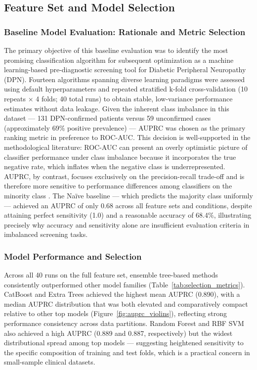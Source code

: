 \documentclass[pdflatex,sn-vancouver-num]{sn-jnl}
\begin{document}
\subsection{Feature Set and Model Selection}

\subsubsection{Baseline Model Evaluation: Rationale and Metric Selection}
The primary objective of this baseline evaluation was to identify the most promising classification algorithm for subsequent optimization as a machine learning-based pre-diagnostic screening tool for Diabetic Peripheral Neuropathy (DPN). Fourteen algorithms spanning diverse learning paradigms were assessed using default hyperparameters and repeated stratified k-fold cross-validation (10 repeats × 4 folds; 40 total runs) to obtain stable, low-variance performance estimates without data leakage.
Given the inherent class imbalance in this dataset — 131 DPN-confirmed patients versus 59 unconfirmed cases (approximately 69\% positive prevalence) — AUPRC was chosen as the primary ranking metric in preference to ROC-AUC. This decision is well-supported in the methodological literature: ROC-AUC can present an overly optimistic picture of classifier performance under class imbalance because it incorporates the true negative rate, which inflates when the negative class is underrepresented. AUPRC, by contrast, focuses exclusively on the precision-recall trade-off and is therefore more sensitive to performance differences among classifiers on the minority class \cite{saito2015precision, davis2006relationship}. The Naïve baseline — which predicts the majority class uniformly — achieved an AUPRC of only 0.68 across all feature sets and conditions, despite attaining perfect sensitivity (1.0) and a reasonable accuracy of 68.4\%, illustrating precisely why accuracy and sensitivity alone are insufficient evaluation criteria in imbalanced screening tasks.

\subsubsection{Model Performance and Selection}
Across all 40 runs on the full feature set, ensemble tree-based methods consistently outperformed other model families (Table~\ref{tab:selection_metrics}). CatBoost and Extra Trees achieved the highest mean AUPRC (0.890), with a median AUPRC distribution that was both elevated and comparatively compact relative to other top models (Figure~\ref{fig:auprc_violins}), reflecting strong performance consistency across data partitions. Random Forest and RBF SVM also achieved a high AUPRC (0.889 and 0.887, respectively) but the widest distributional spread among top models — suggesting heightened sensitivity to the specific composition of training and test folds, which is a practical concern in small-sample clinical datasets.
\end{document}

